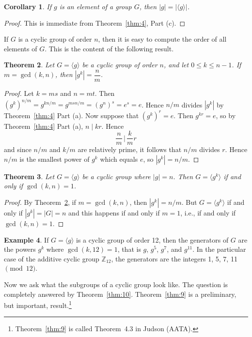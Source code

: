 \documentclass[11pt]{article}
\newcommand{\Z} {{\mathbb Z}}
\newcommand{\order}[1]{\ensuremath{|#1|}}
\newcommand{\divides}{\ensuremath{\mid}}
\newcommand{\<}{\ensuremath{\langle}}
\renewcommand{\>}{\ensuremath{\rangle}}
\newcommand{\eye}{\ensuremath{e}}
\theoremstyle{plain}
\newtheorem{thm}{Theorem}%
\newtheorem{cor}[thm]{Corollary}
\theoremstyle{definition}
\newtheorem{ex}[thm]{Example}
\begin{document}
\begin{cor}    If $g$ is an element of a group $G$, then
$\order{g}=|\langle g\rangle|$.
\end{cor}
\begin{proof}  This is immediate from Theorem~\ref{thm:4}, Part (c).
\end{proof}

If $G$ is a cyclic group  of order $n$,  then it is easy to
compute the order of all elements of $G$.  This is the content of
the following result.

\begin{thm}
\label{thm:6}
  Let $G=\langle g\rangle $ be a cyclic
group of order $n$, and let $0\le k\le n-1$.  If $m=\gcd (k, n)$,
then $\order{g^k}=\dfrac{n}{m}$.
\end{thm}

\begin{proof}  Let $k=ms$ and $n=mt$.  Then
$(g^k)^{n/m}=g^{kn/m}=g^{msn/m}=(g^n)^s=\eye^s=\eye$.  Hence $n/m$
divides $\order{g^k}$ by Theorem~\ref{thm:4} Part (a).  Now suppose that
$(g^k)^r=\eye$.  Then $g^{kr} = \eye$, so by Theorem~\ref{thm:4} Part (a), $n\divides
kr$. Hence $$\frac{n}{ m}\,\Big|\,\frac{k}{ m} r$$ and since $n/m$
and $k/m$ are relatively prime, it follows that $n/m$ divides $r$.
Hence $n/m$ is the smallest power of $g^k$ which equals $\eye$, so
$\order{g^k}=n/m$.
\end{proof}

\begin{thm}  Let $G=\langle g\rangle$ be a cyclic group where
$\order{g}=n$. Then $G=\langle g^k\rangle $ if and only if $\gcd (k, n)
= 1$.
\end{thm}

\begin{proof}  By Theorem~\ref{thm:6},  if $m=\gcd (k, n)$, then $\order{g^k}=n/m$.  But
$G=\langle g^k\rangle $ if and only if $\order{g^k}=|G|=n$ and this
happens if and only if $m=1$, i.e., if and only if $\gcd(k, n)=1$.
\end{proof}

\begin{ex}
  If $G=\langle g\rangle$ is a cyclic group of order 12, then
the generators of $G$ are the powers $g^k$ where $\gcd (k, 12) =
1$, that is $g$, $g^5$, $g^7$, and $g^{11}$.  In the particular
case of the additive cyclic group $\Z_{12}$, the generators are
the integers 1, 5, 7, 11 $\pmod{12}$.
\end{ex}
Now we ask what the subgroups of a  cyclic group look like.  The
question is completely answered by Theorem~\ref{thm:10}.  
Theorem~\ref{thm:9} is a preliminary, but important, result.\footnote{Theorem~\ref{thm:9} is called Theorem~4.3 in Judson (AATA).}
\end{document}
